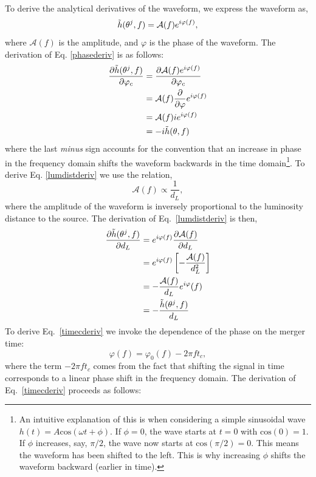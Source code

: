 \documentclass[a4paper,12pt]{article}
\begin{document}
To derive the analytical derivatives of the waveform, we express the waveform as,
\begin{equation}
\Tilde{h}(\theta^{j}, f) = \mathcal{A}(f)e^{i\varphi(f)},
\label{waveformAphase}
\end{equation}
where $\mathcal{A}(f)$ is the amplitude, and $\varphi$ is the phase of the waveform. The derivation of Eq. \eqref{phasederiv} is as follows:
\begin{equation}
    \begin{aligned}
        \frac{\partial \Tilde{h}(\theta^{j},f)}{\partial \varphi_{c}} &= \frac{\partial \mathcal{A}(f)e^{i\varphi(f)}}{\partial \varphi_{c}} \\
        &= \mathcal{A}(f)\frac{\partial}{\partial \varphi} e^{i\varphi(f)} \\
        &= \mathcal{A}(f) ie^{i\varphi(f)} \\
        &= -i\Tilde{h}(\theta,f)
    \end{aligned}
\label{phasederiv2}
\end{equation}
where the last \textit{minus} sign accounts for the convention that an increase in phase in the frequency domain shifts the waveform backwards in the time domain\footnote{An intuitive explanation of this is when considering a simple sinusoidal wave $h(t)=A \mathrm{cos}(\omega t+\phi)$. If $\phi=0$, the wave starts at $t=0$ with $\mathrm{cos}(0)=1$. If $\phi$ increases, say, $\pi/2$, the wave now starts at $\mathrm{cos}(\pi/2)=0$. This means the waveform has been shifted to the left. This is why increasing $\phi$ shifts the waveform backward (earlier in time).}. To derive Eq. \eqref{lumdistderiv} we use the relation,
\begin{equation}
\mathcal{A}(f) \propto \frac{1}{d_L}, 
\label{eq:A_lumdist}
\end{equation}
where the amplitude of the waveform is inversely proportional to the luminosity distance to the source. The derivation of Eq.~\eqref{lumdistderiv} is then,
\begin{equation}
    \begin{aligned}
        \frac{\partial \Tilde{h}(\theta^{j},f)}{\partial d_L} &= e^{i\varphi(f)} \frac{\partial \mathcal{A}(f)}{\partial d_L} \\
        &= e^{i\varphi(f)} \left[-\frac{\mathcal{A}(f)}{d^{2}_L}\right] \\
        &= -\frac{\mathcal{A}(f)}{d_L}e^{i\varphi}(f) \\
        &= -\frac{\Tilde{h}(\theta^{j},f)}{d_L}
    \end{aligned}
\label{lumdistderiv2}
\end{equation}
To derive Eq.~\eqref{timecderiv} we invoke the dependence of the phase on the merger time:
\begin{equation}
    \varphi(f)=\varphi_{0}(f)-2\pi ft_c,
\end{equation}
where the term $-2\pi ft_c$ comes from the fact that shifting the signal in time corresponds to a linear phase shift in the frequency domain. The derivation of Eq.~\eqref{timecderiv} proceeds as follows:
\end{document}
